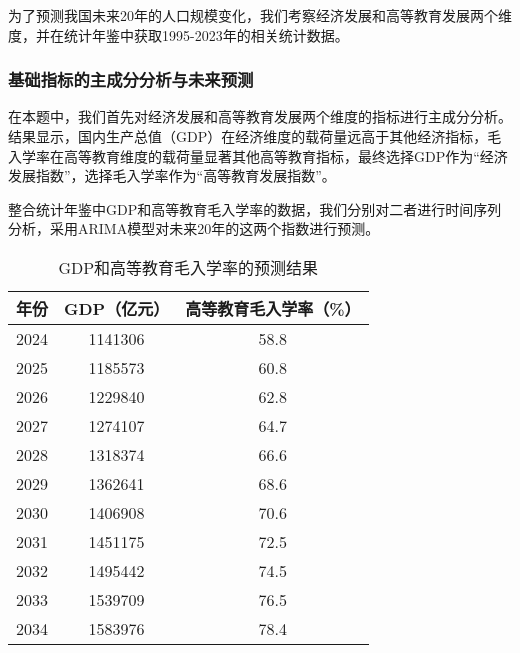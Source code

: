 \documentclass[withoutpreface,bwprint]{cumcmthesis} %
\begin{document}
为了预测我国未来20年的人口规模变化，我们考察经济发展和高等教育发展两个维度，并在统计年鉴中获取1995-2023年的相关统计数据。

\subsubsection{基础指标的主成分分析与未来预测}

在本题中，我们首先对经济发展和高等教育发展两个维度的指标进行主成分分析。结果显示，国内生产总值（GDP）在经济维度的载荷量远高于其他经济指标，毛入学率在高等教育维度的载荷量显著其他高等教育指标，最终选择GDP作为“经济发展指数”，选择毛入学率作为“高等教育发展指数”。

整合统计年鉴中GDP和高等教育毛入学率的数据，我们分别对二者进行时间序列分析，采用ARIMA模型对未来20年的这两个指数进行预测。
\begin{table}[H]
    \centering
    \fontsize{10}{12}\selectfont
    \caption{GDP和高等教育毛入学率的预测结果}
    \begin{minipage}{0.48\textwidth}
        \centering
        \begin{tabular}{|c|c|c|}
        \hline
        年份   & GDP（亿元） & 高等教育毛入学率（\%） \\ 
        \hline
        2024 & 1141306    & 58.8         \\ 
        \hline
        2025 & 1185573    & 60.8         \\ 
        \hline
        2026 & 1229840    & 62.8         \\ 
        \hline
        2027 & 1274107    & 64.7         \\ 
        \hline
        2028 & 1318374    & 66.6         \\ 
        \hline
        2029 & 1362641    & 68.6         \\ 
        \hline
        2030 & 1406908    & 70.6         \\ 
        \hline
        2031 & 1451175    & 72.5         \\ 
        \hline
        2032 & 1495442    & 74.5         \\ 
        \hline
        2033 & 1539709    & 76.5         \\ 
        \hline
        2034 & 1583976    & 78.4         \\ 
        \hline
        \end{tabular}
    \end{minipage}%
    \hfill
    \begin{minipage}{0.48\textwidth}
        \centering

\end{minipage}
\end{table}
\end{document}
